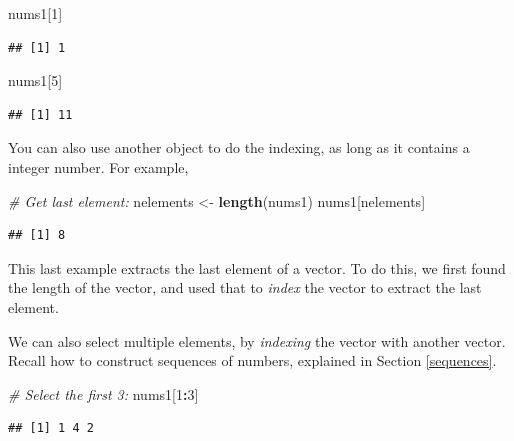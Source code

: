 \documentclass[]{book}
\newenvironment{Shaded}{\begin{snugshade}}{\end{snugshade}}
\newcommand{\CommentTok}[1]{\textcolor[rgb]{0.56,0.35,0.01}{\textit{#1}}}
\newcommand{\DecValTok}[1]{\textcolor[rgb]{0.00,0.00,0.81}{#1}}
\newcommand{\KeywordTok}[1]{\textcolor[rgb]{0.13,0.29,0.53}{\textbf{#1}}}
\newcommand{\NormalTok}[1]{#1}
\newcommand{\OperatorTok}[1]{\textcolor[rgb]{0.81,0.36,0.00}{\textbf{#1}}}
\newcommand{\StringTok}[1]{\textcolor[rgb]{0.31,0.60,0.02}{#1}}
\begin{document}
\begin{Shaded}
\begin{Highlighting}[]
\NormalTok{nums1[}\DecValTok{1}\NormalTok{]}
\end{Highlighting}
\end{Shaded}

\begin{verbatim}
## [1] 1
\end{verbatim}

\begin{Shaded}
\begin{Highlighting}[]
\NormalTok{nums1[}\DecValTok{5}\NormalTok{]}
\end{Highlighting}
\end{Shaded}

\begin{verbatim}
## [1] 11
\end{verbatim}

You can also use another object to do the indexing, as long as it contains a integer number. For example,

\begin{Shaded}
\begin{Highlighting}[]
\CommentTok{# Get last element:}
\NormalTok{nelements <-}\StringTok{ }\KeywordTok{length}\NormalTok{(nums1)}
\NormalTok{nums1[nelements]}
\end{Highlighting}
\end{Shaded}

\begin{verbatim}
## [1] 8
\end{verbatim}

This last example extracts the last element of a vector. To do this, we first found the length of the vector, and used that to \emph{index} the vector to extract the last element.

We can also select multiple elements, by \emph{indexing} the vector with another vector. Recall how to construct sequences of numbers, explained in Section \ref{sequences}.

\begin{Shaded}
\begin{Highlighting}[]
\CommentTok{# Select the first 3:}
\NormalTok{nums1[}\DecValTok{1}\OperatorTok{:}\DecValTok{3}\NormalTok{]}
\end{Highlighting}
\end{Shaded}

\begin{verbatim}
## [1] 1 4 2
\end{verbatim}
\end{document}
